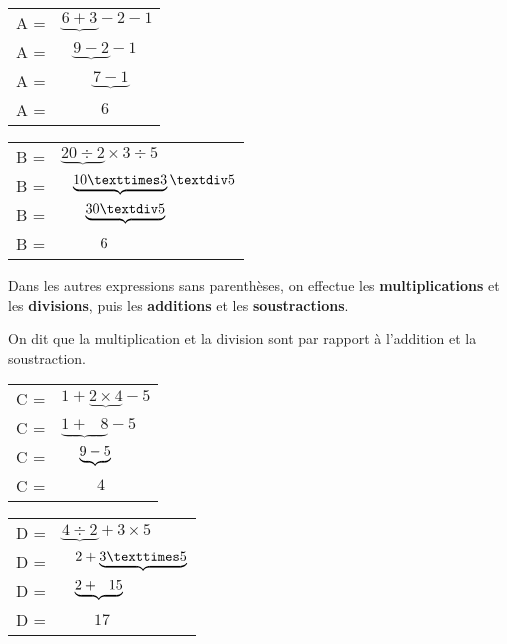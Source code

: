 \documentclass[../€Cours-complet/Cours-complet]{subfiles}
\begin{document}
\begin{exemple}
	\begin{minipage}{0.5\textwidth}
		\begin{tabular}{ll}
			A = & $\underbrace{6 + 3} - 2 - 1 $          \\
			A = & $\phantom{6\ }\underbrace{9 - 2} - 1 $ \\
			A = & $\phantom{6 +\ }\underbrace{7 - 1}$    \\
			A = & $\phantom{6 + 3\ }6$
		\end{tabular}
	\end{minipage}
	\begin{minipage}{0.5\textwidth}
		\begin{tabular}{ll}
			B = & $\underbrace{20 ÷ 2} × 3 ÷ 5 $           \\
			B = & $\hspace{0.8em}\underbrace{10 × 3} ÷ 5 $ \\
			B = & $\hspace{1.7em}\underbrace{30 ÷ 5}$      \\
			B = & $\hspace{2.8em}6$
		\end{tabular}
	\end{minipage}
\end{exemple}

\begin{cours}
	Dans les autres expressions sans parenthèses, on effectue  les \textbf{multiplications} et les \textbf{divisions}, puis les \textbf{additions} et les \textbf{soustractions}.

	On dit que la multiplication et la division sont  par rapport à l'addition et la soustraction.
\end{cours}

\begin{exemple}
	\begin{minipage}{0.5\textwidth}
		\begin{tabular}{ll}
			C = & $1 + \underbrace{2 × 4} - 5$           \\
			C = & $\underbrace{1 + \phantom{2\ }8} - 5 $ \\
			C = & $\hspace{1.3em}\underbrace{9 - 5}$     \\
			C = & $\phantom{1 + 8}4$
		\end{tabular}
	\end{minipage}
	\begin{minipage}{0.5\textwidth}
		\begin{tabular}{ll}
			D = & $\underbrace{4 ÷ 2} + 3 × 5$                      \\
			D = & $\hspace{0.9em}2 + \underbrace{3 × 5}$            \\
			D = & $\hspace{0.9em}\underbrace{2 + \hspace{0.7em}15}$ \\
			D = & $\hspace{2em}17$
		\end{tabular}
	\end{minipage}
\end{exemple}
\end{document}
